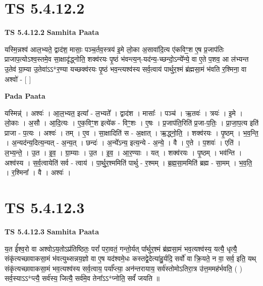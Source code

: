 \documentclass[17pt]{extarticle}
\begin{document}
\section*{ TS 5.4.12.2 }

\textbf{TS 5.4.12.2 } \newline
\textbf{Samhita Paata} \newline

यस्मि॒न्नश्व॑ आल॒भ्यते॒ द्वाद॑श॒ मासाः॒ पञ्च॒र्तव॒स्त्रय॑ इ॒मे लो॒का अ॒सावा॑दि॒त्य ए॑कविꣳ॒॒श ए॒ष प्र॒जाप॑तिः प्राजाप॒त्योऽश्व॒स्तमे॒व सा॒क्षादृ॑द्ध्नोति॒ शक्व॑रयः पृ॒ष्ठं भ॑वन्त्य॒न्-यद॑न्य॒-च्छन्दो॒ऽन्ये᳚न्ये॒ वा ए॒ते प॒शव॒ आ ल॑भ्यन्त उ॒तेव॑ ग्रा॒म्या उ॒तेवा॑ऽऽ*र॒ण्या यच्छक्व॑रयः पृ॒ष्ठं भव॒न्त्यश्व॑स्य सर्व॒त्वाय॑ पार्थुर॒श्मं ब्र॑ह्मसा॒मं भ॑वति र॒श्मिना॒ वा अश्वो॑ - [  ] \newline

\textbf{Pada Paata} \newline

यस्मिन्न्॑ । अश्वः॑ । आ॒ल॒भ्यत॒ इत्या᳚ - ल॒भ्यते᳚ । द्वाद॑श । मासाः᳚ । पञ्च॑ । ऋ॒तवः॑ । त्रयः॑ । इ॒मे । लो॒काः । अ॒सौ । आ॒दि॒त्यः । ए॒क॒विꣳ॒॒श इत्ये॑क - विꣳ॒॒शः । ए॒षः । प्र॒जाप॑ति॒रिति॑ प्र॒जा-प॒तिः॒ । प्रा॒जा॒प॒त्य इति॑ प्राजा - प॒त्यः । अश्वः॑ । तम् । ए॒व । सा॒क्षादिति॑ स - अ॒क्षात् । ऋ॒द्ध्नो॒ति॒ । शक्व॑रयः । पृ॒ष्ठम् । भ॒व॒न्ति॒ । अ॒न्यद॑न्य॒दित्य॒न्यत् - अ॒न्य॒त् । छन्दः॑ । अ॒न्ये᳚ऽन्य॒ इत्य॒न्ये - अ॒न्ये॒ । वै । ए॒ते । प॒शवः॑ । एति॑ । ल॒भ्य॒न्ते॒ । उ॒त । इ॒व॒ । ग्रा॒म्याः । उ॒त । इ॒व॒ । आ॒र॒ण्याः । यत् । शक्व॑रयः । पृ॒ष्ठम् । भव॑न्ति । अश्व॑स्य । स॒र्व॒त्वायेति॑ सर्व - त्वाय॑ । पा॒र्थु॒र॒श्ममिति॑ पार्थु - र॒श्मम् । ब्र॒ह्म॒सा॒ममिति॑ ब्रह्म - सा॒मम् । भ॒व॒ति॒ । र॒श्मिना᳚ । वै । अश्वः॑ ।  \newline




\section*{ TS 5.4.12.3 }

\textbf{TS 5.4.12.3 } \newline
\textbf{Samhita Paata} \newline

य॒त ई᳚श्व॒रो वा अश्वोऽय॒तोऽप्र॑तिष्ठितः॒ परां᳚ परा॒वतं॒ गन्तो॒र्यत् पा᳚र्थुर॒श्मं ब्र॑ह्मसा॒मं भव॒त्यश्व॑स्य॒ यत्यै॒ धृत्यै॒ संकृ॑त्यच्छावाकसा॒मं भ॑वत्युथ्सन्नय॒ज्ञो वा ए॒ष यद॑श्वमे॒धः कस्तद्वे॒देत्या॑हु॒र्यदि॒ सर्वो॑ वा क्रि॒यते॒ न वा॒ सर्व॒ इति॒ यथ् संकृ॑त्यच्छावाकसा॒मं भव॒त्यश्व॑स्य सर्व॒त्वाय॒ पर्या᳚प्त्या॒ अन॑न्तरायाय॒ सर्व॑स्तोमोऽतिरा॒त्र उ॑त्त॒ममह॑र्भवति॒ ( ) सर्व॒स्याऽऽ*प्त्यै॒ सर्व॑स्य॒ जित्यै॒ सर्व॑मे॒व तेना᳚ऽऽ*प्नोति॒ सर्वं॑ जयति ॥ \newline
\end{document}
